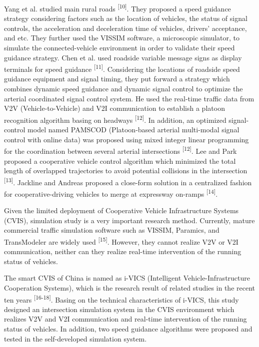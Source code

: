 Yang et al. studied main rural roads \textsuperscript{{[}10{]}}. They
proposed a speed guidance strategy considering factors such as the
location of vehicles, the status of signal controls, the acceleration
and deceleration time of vehicles, drivers' acceptance, and etc. They
further used the VISSIM software, a microscopic simulator, to simulate
the connected-vehicle environment in order to validate their speed
guidance strategy. Chen et al. used roadside variable message signs as
display terminals for speed guidance \textsuperscript{{[}11{]}}.
Considering the locations of roadside speed guidance equipment and
signal timing, they put forward a strategy which combines dynamic speed
guidance and dynamic signal control to optimize the arterial coordinated
signal control system. He used the real-time traffic data from V2V
(Vehicle-to-Vehicle) and V2I communication to establish a platoon
recognition algorithm basing on headways \textsuperscript{{[}12{]}}. In
addition, an optimized signal-control model named PAMSCOD (Platoon-based
arterial multi-modal signal control with online data) was proposed using
mixed integer linear programming for the coordination between several
arterial intersections \textsuperscript{{[}12{]}}. Lee and Park proposed
a cooperative vehicle control algorithm which minimized the total length
of overlapped trajectories to avoid potential collisions in the
intersection \textsuperscript{{[}13{]}}. Jackline and Andreas proposed a
close-form solution in a centralized fashion for cooperative-driving
vehicles to merge at expressway on-ramps \textsuperscript{{[}14{]}}.

Given the limited deployment of Cooperative Vehicle Infrastructure
Systems (CVIS), simulation study is a very important research method.
Currently, mature commercial traffic simulation software such as VISSIM,
Paramics, and TransModeler are widely used \textsuperscript{{[}15{]}}.
However, they cannot realize V2V or V2I communication, neither can they
realize real-time intervention of the running status of vehicles.

The smart CVIS of China is named as i-VICS (Intelligent
Vehicle-Infrastructure Cooperation Systems), which is the research
result of related studies in the recent ten years
\textsuperscript{{[}16-18{]}}. Basing on the technical characteristics
of i-VICS, this study designed an intersection simulation system in the
CVIS environment which realizes V2V and V2I communication and real-time
intervention of the running status of vehicles. In addition, two speed
guidance algorithms were proposed and tested in the self-developed
simulation system.

